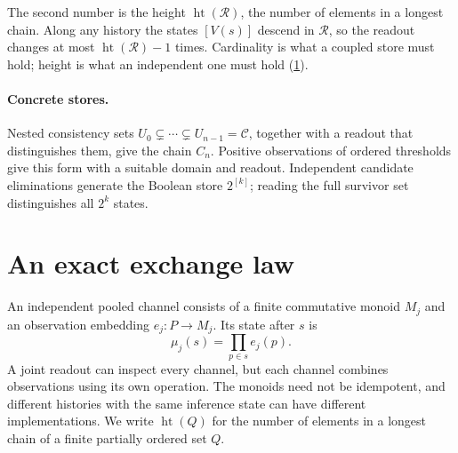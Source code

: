 \documentclass{article}
\theoremstyle{definition}
\newcommand{\C}{\mathcal C}
\newcommand{\R}{\mathcal R}
\newcommand{\height}{\operatorname{ht}}
\begin{document}
The second number is the height $\height(\R)$, the number of elements in a longest chain. Along any history the states $[V(s)]$ descend in $\R$, so the readout changes at most $\height(\R)-1$ times. Cardinality is what a coupled store must hold; height is what an independent one must hold (\cref{sec:exchange}).

\paragraph{Concrete stores.}
Nested consistency sets $U_0\subsetneq\cdots\subsetneq U_{n-1}=\C$, together with a readout that distinguishes them, give the chain $C_n$. Positive observations of ordered thresholds give this form with a suitable domain and readout. Independent candidate eliminations generate the Boolean store $2^{[k]}$; reading the full survivor set distinguishes all $2^k$ states.

\section{An exact exchange law}\label{sec:exchange}
An independent pooled channel consists of a finite commutative monoid $M_j$ and an observation embedding $e_j:P\to M_j$. Its state after $s$ is
\begin{equation}
 \mu_j(s)=\prod_{p\in s}e_j(p).
 \label{eq:independent}
\end{equation}
A joint readout can inspect every channel, but each channel combines observations using its own operation. The monoids need not be idempotent, and different histories with the same inference state can have different implementations. We write $\height(Q)$ for the number of elements in a longest chain of a finite partially ordered set $Q$.
\end{document}
